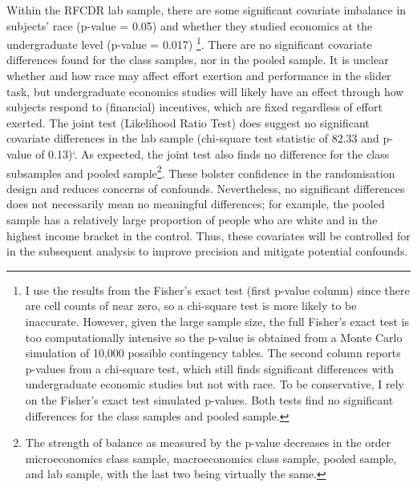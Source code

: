 \documentclass[
  12,
  letterpaper,
  DIV=11,
  numbers=noendperiod]{scrartcl}
\begin{document}
Within the RFCDR lab sample, there are some significant covariate
imbalance in subjects' race (p-value = 0.05) and whether they studied
economics at the undergraduate level (p-value = 0.017) \footnote{I use
  the results from the Fisher's exact test (first p-value column) since
  there are cell counts of near zero, so a chi-square test is more
  likely to be inaccurate. However, given the large sample size, the
  full Fisher's exact test is too computationally intensive so the
  p-value is obtained from a Monte Carlo simulation of 10,000 possible
  contingency tables. The second column reports p-values from a
  chi-square test, which still finds significant differences with
  undergraduate economic studies but not with race. To be conservative,
  I rely on the Fisher's exact test simulated p-values. Both tests find
  no significant differences for the class samples and pooled sample.}.
There are no significant covariate differences found for the class
samples, nor in the pooled sample. It is unclear whether and how race
may affect effort exertion and performance in the slider task, but
undergraduate economics studies will likely have an effect through how
subjects respond to (financial) incentives, which are fixed regardless
of effort exerted. The joint test (Likelihood Ratio Test) does suggest
no significant covariate differences in the lab sample (chi-square test
statistic of 82.33 and p-value of 0.13)`. As expected, the joint test
also finds no difference for the class subsamples and pooled
sample\footnote{The strength of balance as measured by the p-value
  decreases in the order microeconomics class sample, macroeconomics
  class sample, pooled sample, and lab sample, with the last two being
  virtually the same.}. These bolster confidence in the randomisation
design and reduces concerns of confounds. Nevertheless, no significant
differences does not necessarily mean no meaningful differences; for
example, the pooled sample has a relatively large proportion of people
who are white and in the highest income bracket in the control. Thus,
these covariates will be controlled for in the subsequent analysis to
improve precision and mitigate potential confounds.
\end{document}
